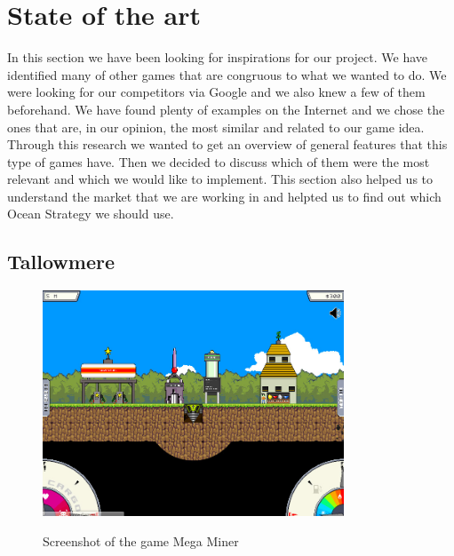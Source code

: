 \documentclass[12p]{article}
\begin{document}

\newpage
\section{State of the art}

In this section we have been looking for inspirations for our project. We have identified many of other games that are congruous to what we wanted to do.
We were looking for our competitors via Google and we also knew a few of them beforehand. We have found plenty of examples on the Internet and we chose the ones that are, in our opinion, the most similar and related to our game idea. Through this research we wanted to get an overview of general features that this type of games have. Then we decided to discuss which of them were the most relevant and which we would like to implement. This section also helped us to understand the market that we are working in and helpted us to find out which Ocean Strategy we should use.


\subsection{Tallowmere} \label{StateOfTheArt_Tallowmere}

\begin{figure}[ht]
    \center
    \includegraphics[width=0.8\textwidth]{StateOfTheArtScreenshots/mega_miner}
    \label{StateOfTheArt_Screenshots_Tallowmere}
    \caption{Screenshot of the game Mega Miner \cite{MegaMinerScreenshot}}
\end{figure}
\end{document}
